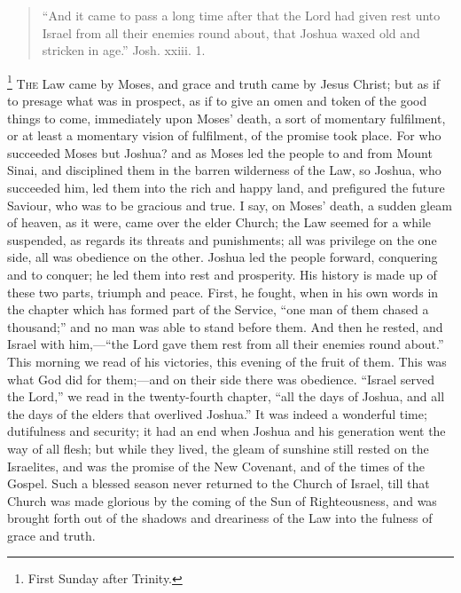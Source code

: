 
\begin{quote}

``And it came to pass a long time after that the Lord had
given rest unto Israel from all their enemies round about, that
Joshua waxed old and stricken in age.'' Josh. xxiii. 1.

\end{quote}

\footnote{First Sunday after Trinity.} T\textsc{he} Law came by Moses, and grace and truth came by Jesus Christ;
but as if to presage what was in prospect, as if to give an omen and
token of the good things to come, immediately upon Moses' death, a
sort of momentary fulfilment, or at least a momentary vision of
fulfilment, of the promise took place. For who succeeded Moses but
Joshua? and as Moses led the people to and from Mount Sinai, and
disciplined them in the barren wilderness of the Law, so Joshua, who
succeeded him, led them into the rich and happy land, and prefigured
the future Saviour, who was to be gracious and true. I say, on Moses'
death, a sudden gleam of heaven, as it were, came over the elder
Church; the Law seemed for a while suspended, as regards its threats
and punishments; all was privilege on the one side, all was obedience
on the other. Joshua led the people forward, conquering and to
conquer; he led them into rest and prosperity. His history is made up
of these two parts, triumph and peace. First, he fought, when in his
own words in the chapter which has formed part of the Service,
``one man of them chased a thousand;'' and no man was able to
stand before them. And then he rested, and Israel with him,—``the
Lord gave them rest from all their enemies round about.'' This
morning we read of his victories, this evening of the fruit of them.
This was what God did for them;—and on their side there was
obedience. ``Israel served the Lord,'' we read in the
twenty-fourth chapter, ``all the days of Joshua, and all the days
of the elders that overlived Joshua.'' It was indeed a wonderful
time; dutifulness and security; it had an end when Joshua and his
generation went the way of all flesh; but while they lived, the gleam
of sunshine still rested on the Israelites, and was the promise of the
New Covenant, and of the times of the Gospel. Such a blessed season
never returned to the Church of Israel, till that Church was made
glorious by the coming of the Sun of Righteousness, and was brought
forth out of the shadows and dreariness of the Law into the fulness of
grace and truth.


